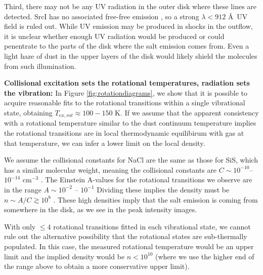 \documentclass[twocolumn]{aastex62}
\newcommand{\sourcei}{SrcI\xspace}
\begin{document}
Third, there may not be any UV radiation in the outer disk where these lines
are detected.  \sourcei has no associated free-free emission
\citep{Plambeck2013a}, so a strong $\lambda<912$ \AA\ UV field is ruled out.  While UV
emission may be produced in shocks in the outflow, it is unclear whether enough
UV radiation would be produced or could penentrate to the parts of the disk where
the salt emission comes from.  Even a light haze of dust in the upper layers of
the disk would likely shield the molecules from such illumination.

\par{\textbf{Collisional excitation sets the rotational temperatures, radiation
sets the vibration:}}
In Figure \ref{fig:rotationdiagrams}, we show that it is possible to acquire
reasonable fits to the rotational transitions within a single vibrational state,
obtaining $T_{ex,rot}\approx100-150$ K.  If we assume that the apparent consistency
with a rotational temperature similar to the dust continuum temperature implies
the rotational transitions are in local thermodynamic equilibirum with gas at 
that temperature, we can infer a lower limit on the local density.

We assume the collisional constants for NaCl are the same as those for SiS,
which has a similar molecular weight, meaning the collisional constants are
$C\sim10^{-10}$--$10^{-14}$ cm$^{-3}$ \pers \citep{Dayou2006a}. 
The Einstein A-values for the rotational transitions we observe are in the
range $A\sim10^{-2}$ -- $10^{-1}$ \pers
Dividing these implies the density must be $n\sim A/C \gtrsim10^8$ \percc.
These high densities imply that the salt emission is coming from
somewhere in the disk, as we see in the peak intensity images. 

With only $\leq4$ rotational transitions fitted in each vibrational
state, we cannot rule out the alternative possibility that the rotational
states are sub-thermally populated.  In this case, the measured rotational
temperature would be an upper limit and the implied density would be
$n<10^{10}$ \percc (where we use the higher end of the range above to obtain a
more conservative upper limit). 
\end{document}
